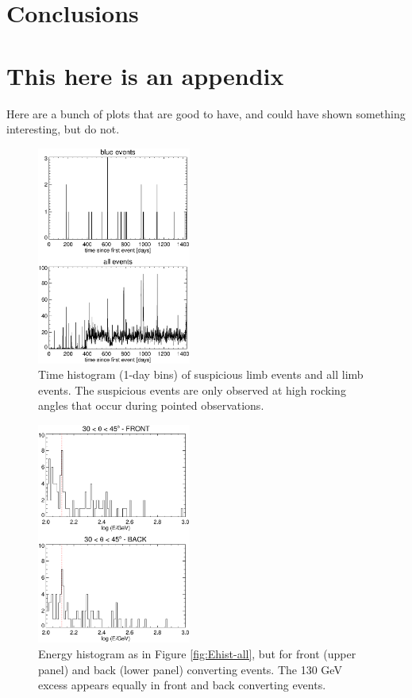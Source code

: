 \documentclass[aps,twocolumn,prd,superscriptaddress,showpacs,nofootinbib,fixfloat]{revtex4}
\begin{document}
\section{Conclusions}

\clearpage
\appendix
\section{This here is an appendix}

Here are a bunch of plots that are good to have, and could have shown
something interesting, but do not. 

\begin{figure}[p]
\centering
\includegraphics[width=0.45\textwidth]{plots/timehist.ps}
\caption{Time histogram (1-day bins) of suspicious limb events and all limb
events.  The suspicious events are only observed at high rocking
angles that occur during pointed observations.
}
\label{fig:timehist}
\end{figure}


\begin{figure}[p]
\centering
\includegraphics[width=0.45\textwidth]{plots/Ehist-frontback.ps}
\caption{Energy histogram as in Figure \ref{fig:Ehist-all}, but for front
  (upper panel) and back (lower panel) converting events.  The 130 GeV excess
  appears equally in front and back converting events. 
}
\label{fig:Ehist-frontback}
\end{figure}
\end{document}
